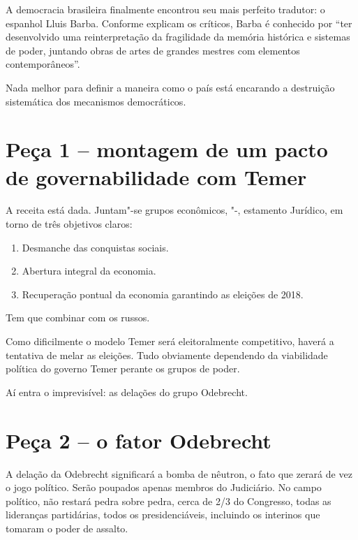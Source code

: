  

A democracia brasileira finalmente encontrou seu mais perfeito tradutor:
o espanhol Lluis Barba. Conforme explicam os críticos, Barba é conhecido
por ``ter desenvolvido uma reinterpretação da fragilidade da memória
histórica e sistemas de poder, juntando obras de artes de grandes
mestres com elementos contemporâneos''.

Nada melhor para definir a maneira como o país está encarando a
destruição sistemática dos mecanismos democráticos.~

\section{Peça 1 -- montagem de um pacto de governabilidade com Temer}

A receita está dada. Juntam"-se grupos econômicos, "-, estamento
Jurídico, em torno de três objetivos claros:

\begin{enumerate}
\itemsep1pt\parskip0pt
\item
  Desmanche das conquistas sociais.
\item
  Abertura integral da economia.
\item
  Recuperação pontual da economia garantindo as eleições de 2018.
\end{enumerate}

Tem que combinar com os russos.

Como dificilmente o modelo Temer será eleitoralmente competitivo, haverá
a tentativa de melar as eleições. Tudo obviamente dependendo da
viabilidade política do governo Temer perante os grupos de poder.

Aí entra o imprevisível: as delações do grupo Odebrecht.

\section{Peça 2 -- o fator Odebrecht}

A delação da Odebrecht significará a bomba de nêutron, o fato que zerará
de vez o jogo político. Serão poupados apenas membros do Judiciário. No
campo político, não restará pedra sobre pedra, cerca de 2/\allowbreak{}3 do
Congresso, todas as lideranças partidárias, todos os presidenciáveis,
incluindo os interinos que tomaram o poder de assalto.

